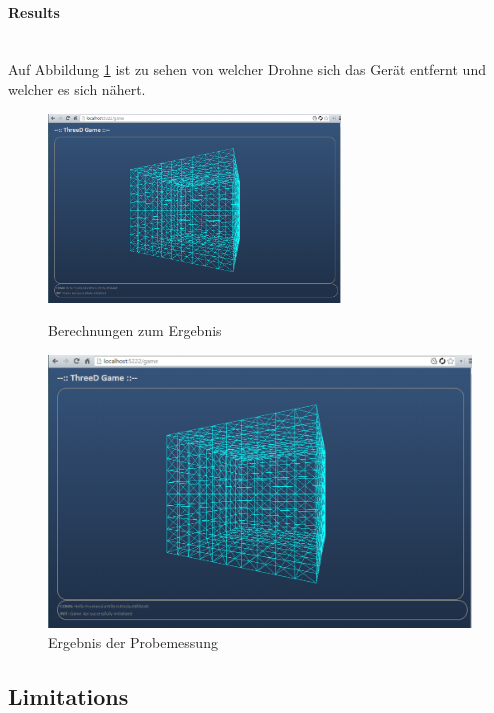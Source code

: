 \documentclass[a4paper]{spie}  %
\begin{document}
\paragraph{Results}\mbox{}\\
Auf Abbildung \ref{fig:test1} ist zu sehen von welcher Drohne sich das Gerät entfernt und welcher es sich nähert.\\

\begin{figure}[H]
\begin{minipage}[t]{0.4\textwidth}
\vspace{0pt}
\includegraphics[height=5cm]{./images/FrontendInit.png}
\caption{Berechnungen zum Ergebnis}
\label{fig:tablleMessung}
\end{minipage}
\hfill
\begin{minipage}[t]{0.5\textwidth}
\vspace{0pt}
		\includegraphics[width=\textwidth]{./images/FrontendInit.png}
		\caption{Ergebnis der Probemessung}
		\label{fig:test1}
\end{minipage}
\end{figure}

\subsection{Limitations}
\end{document}
